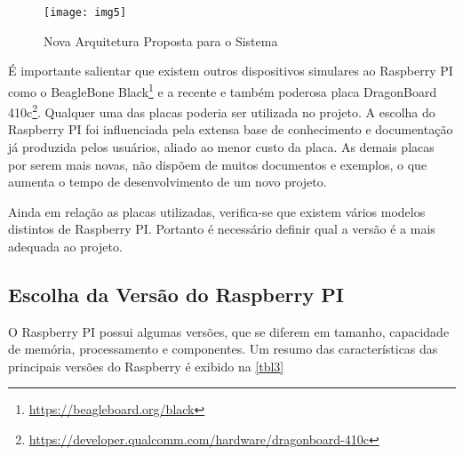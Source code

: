 		\begin{figure}[!htb]	
			\captionsetup{justification=centering}
			\begin{center}
				\texttt{[image: img5]}  %
				\caption[Nova Arquitetura Proposta para o Sistema]{\label{img5} Nova Arquitetura Proposta para o Sistema }
			\end{center}		
		\end{figure}
		
		É importante salientar que existem outros dispositivos simulares ao Raspberry PI como o BeagleBone Black\footnote{\url{https://beagleboard.org/black}} e a recente e também poderosa placa DragonBoard 410c\footnote{\url{https://developer.qualcomm.com/hardware/dragonboard-410c}}. Qualquer uma das placas poderia ser utilizada no projeto. A escolha do Raspberry PI foi influenciada pela extensa base de conhecimento e documentação já produzida pelos usuários, aliado ao menor custo da placa.  As demais placas por serem mais novas, não dispõem de muitos documentos e exemplos, o que aumenta o tempo de desenvolvimento de um novo projeto.
		
		Ainda em relação as placas utilizadas, verifica-se que existem vários modelos distintos de Raspberry PI. Portanto é necessário definir qual a versão é a mais adequada ao projeto.
		
		\subsection{Escolha da Versão do Raspberry PI}
			O Raspberry PI possui algumas versões, que se diferem em tamanho, capacidade de memória, processamento e componentes. Um resumo das características das principais versões do Raspberry é exibido na \autoref{tbl3}
			
